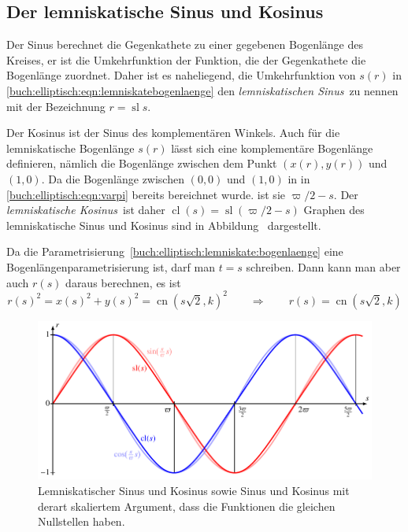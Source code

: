 \subsection{Der lemniskatische Sinus und Kosinus}
Der Sinus berechnet die Gegenkathete zu einer gegebenen Bogenlänge des
Kreises, er ist die Umkehrfunktion der Funktion, die der Gegenkathete
die Bogenlänge zuordnet.
Daher ist es naheliegend, die Umkehrfunktion von $s(r)$ in 
\eqref{buch:elliptisch:eqn:lemniskatebogenlaenge}
den {\em lemniskatischen Sinus} zu nennen mit der Bezeichnung
$r=\operatorname{sl} s$.

Der Kosinus ist der Sinus des komplementären Winkels.
Auch für die lemniskatische Bogenlänge $s(r)$ lässt sich eine
komplementäre Bogenlänge definieren, nämlich die Bogenlänge zwischen
dem Punkt $(x(r), y(r))$ und $(1,0)$.
Da die Bogenlänge zwischen $(0,0)$ und $(1,0)$ in
in \eqref{buch:elliptisch:eqn:varpi} bereits bereichnet wurde.
ist sie $\varpi/2-s$.
Der {\em lemniskatische Kosinus} ist daher
$\operatorname{cl}(s) = \operatorname{sl}(\varpi/2-s)$
Graphen des lemniskatische Sinus und Kosinus sind in
Abbildung~\label{buch:elliptisch:figure:slcl} dargestellt.

Da die Parametrisierung~\eqref{buch:elliptisch:lemniskate:bogenlaenge}
eine Bogenlängenparametrisierung ist, darf man $t=s$ schreiben.
Dann kann man aber auch $r(s)$ daraus berechnen,
es ist
\[
r(s)^2
=
x(s)^2 + y(s)^2
=
\operatorname{cn}(s\sqrt{2},k)^2
\qquad\Rightarrow\qquad
r(s)
=
\operatorname{cn}(s\sqrt{2},k)
\]

\begin{figure}
\centering
\includegraphics[width=\textwidth]{chapters/110-elliptisch/images/slcl.pdf}
\caption{
Lemniskatischer Sinus und Kosinus sowie Sinus und Kosinus
mit derart skaliertem Argument, dass die Funktionen die gleichen Nullstellen
haben.
\label{buch:elliptisch:figure:slcl}}
\end{figure}
